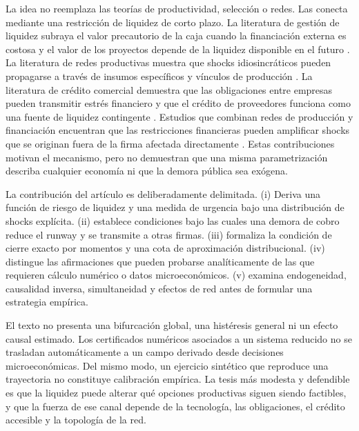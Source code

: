 \documentclass[11pt,a4paper]{article}
\begin{document}
La idea no reemplaza las teorías de productividad, selección o redes. Las conecta mediante una restricción de liquidez de corto plazo. La literatura de gestión de liquidez subraya el valor precautorio de la caja cuando la financiación externa es costosa y el valor de los proyectos depende de la liquidez disponible en el futuro \citep{almeida2014,almeida2007,fazzari1988}. La literatura de redes productivas muestra que shocks idiosincráticos pueden propagarse a través de insumos específicos y vínculos de producción \citep{acemoglu2012,carvalho2014,barrot2016}. La literatura de crédito comercial demuestra que las obligaciones entre empresas pueden transmitir estrés financiero y que el crédito de proveedores funciona como una fuente de liquidez contingente \citep{boissay2013,jacobson2015,amberg2021,costello2020}. Estudios que combinan redes de producción y financiación encuentran que las restricciones financieras pueden amplificar shocks que se originan fuera de la firma afectada directamente \citep{demir2024,huremovic2026}. Estas contribuciones motivan el mecanismo, pero no demuestran que una misma parametrización describa cualquier economía ni que la demora pública sea exógena.

La contribución del artículo es deliberadamente delimitada. (i) Deriva una función de riesgo de liquidez y una medida de urgencia bajo una distribución de shocks explícita. (ii) establece condiciones bajo las cuales una demora de cobro reduce el runway y se transmite a otras firmas. (iii) formaliza la condición de cierre exacto por momentos y una cota de aproximación distribucional. (iv) distingue las afirmaciones que pueden probarse analíticamente de las que requieren cálculo numérico o datos microeconómicos. (v) examina endogeneidad, causalidad inversa, simultaneidad y efectos de red antes de formular una estrategia empírica.

El texto no presenta una bifurcación global, una histéresis general ni un efecto causal estimado. Los certificados numéricos asociados a un sistema reducido no se trasladan automáticamente a un campo derivado desde decisiones microeconómicas. Del mismo modo, un ejercicio sintético que reproduce una trayectoria no constituye calibración empírica. La tesis más modesta y defendible es que la liquidez puede alterar qué opciones productivas siguen siendo factibles, y que la fuerza de ese canal depende de la tecnología, las obligaciones, el crédito accesible y la topología de la red.
\end{document}
